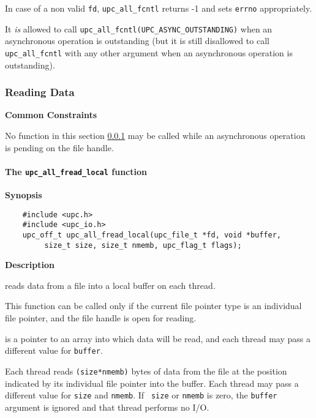 
\np In case of a non valid {\tt fd}, {\tt upc\_all\_fcntl} returns -1 and sets {\tt errno}
appropriately.

\np It \emph{is} allowed to call {\tt upc\_all\_fcntl(UPC\_ASYNC\_OUTSTANDING)} when an
asynchronous operation is outstanding (but it is still disallowed to call
{\tt upc\_all\_fcntl} with any other argument when an asynchronous operation is
outstanding).

\subsubsection{Reading Data}
\label{io-func-read}
{\bf Common Constraints}

\npf No function in this section \ref{io-func-read} may be called while an asynchronous
operation is pending on the file handle.

\paragraph{The {\tt upc\_all\_fread\_local} function}

{\bf Synopsis}

\npf\vspace{-2.5em}
\begin{verbatim}
    #include <upc.h>
    #include <upc_io.h>
    upc_off_t upc_all_fread_local(upc_file_t *fd, void *buffer, 
         size_t size, size_t nmemb, upc_flag_t flags);
\end{verbatim}

{\bf Description}

 reads data from a file into a local buffer on
each thread\textit{.}

\np This function can be called only if the current file pointer type is an
individual file pointer, and the file handle is open for reading. 

 is a pointer to an array into which data will be read, and each
thread may pass a different value for {\tt buffer}.

\np Each thread reads {\tt (size*nmemb)} bytes of data from the
file at the position indicated by its individual file pointer into the buffer.
Each thread may pass a different value for {\tt size} and {\tt nmemb}. If {\tt
size} or {\tt nmemb} is zero, the {\tt buffer} argument is ignored and that
thread performs no I/O.

